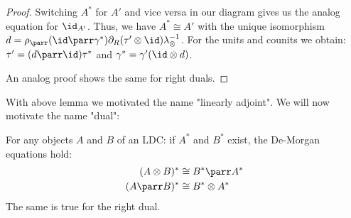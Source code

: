 \documentclass[DIN, pagenumber=false, fontsize=11pt, parskip=half, colorinlistoftodos, svgnames]{scrartcl}
\begin{document}
\begin{proof}
		Switching $A^*$ for $A'$ and vice versa in our diagram gives us the analog equation for $\id_{A'}$. 
		Thus, we have $A^* \cong A'$ with the unique isomorphism 
		$d = \rho_\parr (\id \parr \gamma^*) \partial_R (\tau' \otimes \id) \lambda_\otimes^{-1}$. 
		For the units and counits we obtain: 
		$\tau' = (d \parr \id) \tau^*$ and $\gamma^* = \gamma' (\id \otimes d)$.
		
		An analog proof shows the same for right duals.
	\end{proof}
	
	With above lemma we motivated the name "linearly adjoint". We will now motivate the name "dual":
	
	\begin{lemma}
		\label{lemma: deMorgan}
		For any objects $A$ and $B$ of an LDC: if $A^*$ and $B^*$ exist, the De-Morgan equations hold:
		\begin{align*}
			(A \otimes B)^* & \cong B^* \parr A^* 
			\\
			(A \parr B)^* & \cong B^* \otimes A^*
		\end{align*}
		The same is true for the right dual.
	\end{lemma}
	
\end{document}
